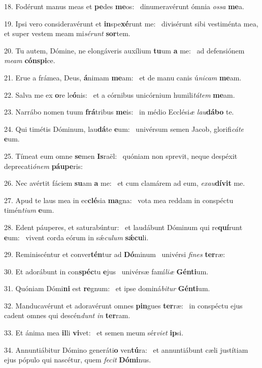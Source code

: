 18. Fodérunt manus meas et \textbf{pe}des \textbf{me}os: \ast\  dinumeravérunt ómnia \textit{os}\textit{sa} \textbf{me}a.\

19. Ipsi vero consideravérunt et \textbf{in}spe\textbf{xé}runt me: \ast\  divisérunt sibi vestiménta mea, et super vestem meam mi\textit{sé}\textit{runt} \textbf{sor}tem.\

20. Tu autem, Dómine, ne elongáveris auxílium \textbf{tu}um \textbf{a} me: \ast\  ad defensiónem \textit{me}\textit{am} \textbf{cón}\textbf{spi}ce.\

21. Erue a frámea, Deus, \textbf{á}nimam \textbf{me}am: \ast\  et de manu canis ú\textit{ni}\textit{cam} \textbf{me}am.\

22. Salva me ex \textbf{o}re le\textbf{ó}nis: \ast\  et a córnibus unicórnium humili\textit{tá}\textit{tem} \textbf{me}am.\

23. Narrábo nomen tuum \textbf{frá}tribus \textbf{me}is: \ast\  in médio Ecclési\textit{æ} \textit{lau}\textbf{dá}\textbf{bo} te.\

24. Qui timétis Dóminum, lau\textbf{dá}te \textbf{e}um: \ast\  univérsum semen Jacob, glorifi\textit{cá}\textit{te} \textbf{e}um.\

25. Tímeat eum omne \textbf{se}men \textbf{Is}raël: \ast\  quóniam non sprevit, neque despéxit deprecati\textit{ó}\textit{nem} \textbf{páu}\textbf{pe}ris:\

26. Nec avértit fáciem \textbf{su}am \textbf{a} me: \ast\  et cum clamárem ad eum, \textit{ex}\textit{au}\textbf{dí}\textbf{vit} me.\

27. Apud te laus mea in ec\textbf{clé}sia \textbf{ma}gna: \ast\  vota mea reddam in conspéctu timén\textit{ti}\textit{um} \textbf{e}um.\

28. Edent páuperes, et saturabúntur: \dag\  et laudábunt Dóminum qui re\textbf{quí}runt \textbf{e}um: \ast\  vivent corda eórum in sǽ\textit{cu}\textit{lum} \textbf{sǽ}\textbf{cu}li.\

29. Reminiscéntur et conver\textbf{tén}tur ad \textbf{Dó}minum \ast\  univérsi \textit{fi}\textit{nes} \textbf{ter}ræ:\

30. Et adorábunt in con\textbf{spéc}tu \textbf{e}jus \ast\  univérsæ famí\textit{li}\textit{æ} \textbf{Gén}\textbf{ti}um.\

31. Quóniam Dómi\textbf{ni} est \textbf{re}gnum: \ast\  et ipse dominá\textit{bi}\textit{tur} \textbf{Gén}\textbf{ti}um.\

32. Manducavérunt et adoravérunt omnes \textbf{pin}gues \textbf{ter}ræ: \ast\  in conspéctu ejus cadent omnes qui descén\textit{dunt} \textit{in} \textbf{ter}ram.\

33. Et ánima mea \textbf{il}li \textbf{vi}vet: \ast\  et semen meum sér\textit{vi}\textit{et} \textbf{ip}si.\

34. Annuntiábitur Dómino generáti\textbf{o} ven\textbf{tú}ra: \ast\  et annuntiábunt cæli justítiam ejus pópulo qui nascétur, quem \textit{fe}\textit{cit} \textbf{Dó}\textbf{mi}nus.\

